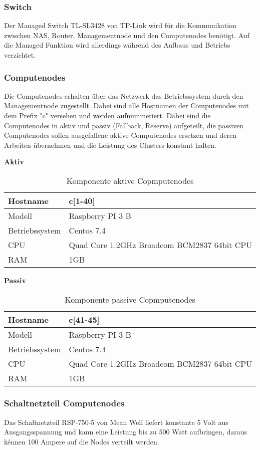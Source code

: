 \subsubsection{Switch}
Der Managed Switch TL-SL3428 von TP-Link wird für die Kommunikation zwischen NAS, Router, Managementnode und den Computenodes benötigt. Auf die Managed Funktion wird allerdings während des Aufbaus und Betriebs verzichtet.

\subsubsection{Computenodes}
Die Computenodes erhalten über das Netzwerk das Betriebssystem durch den Managementnode zugestellt. Dabei sind alle Hostnamen der Computenodes mit dem Prefix "c" versehen und werden aufnummeriert. Dabei sind die Computenodes in aktiv und passiv (Fallback, Reserve) aufgeteilt, die passiven Computenodes sollen ausgefallene aktive Computenodes ersetzen und deren Arbeiten übernehmen und die Leistung des Clusters konstant halten.

\textbf{Aktiv}
\begin{table}[H]
\centering
\begin{tabular}{|l|l|}
\hline
Hostname & c[1-40] \\\hline
Modell & Raspberry PI 3 B\\\hline
Betriebssystem & Centos 7.4 \\\hline
CPU & Quad Core 1.2GHz Broadcom BCM2837 64bit CPU \\\hline
RAM & 1GB  \\\hline
\end{tabular}
\caption{Komponente aktive Copmputenodes}
\end{table}

\textbf{Passiv}
\begin{table}[H]
\centering
\begin{tabular}{|l|l|}
\hline
Hostname & c[41-45] \\\hline
Modell & Raspberry PI 3 B\\\hline
Betriebssystem & Centos 7.4 \\\hline
CPU & Quad Core 1.2GHz Broadcom BCM2837 64bit CPU \\\hline
RAM & 1GB  \\\hline
\end{tabular}
\caption{Komponente passive Copmputenodes}
\end{table}

\subsubsection{Schaltnetzteil Computenodes}
Das Schaltnetzteil RSP-750-5 von Mean Well liefert konstante 5 Volt aus Ausgangsspannung und kann eine Leistung bis zu 500 Watt aufbringen, daraus kénnen 100 Ampere auf die Nodes verteilt werden.


